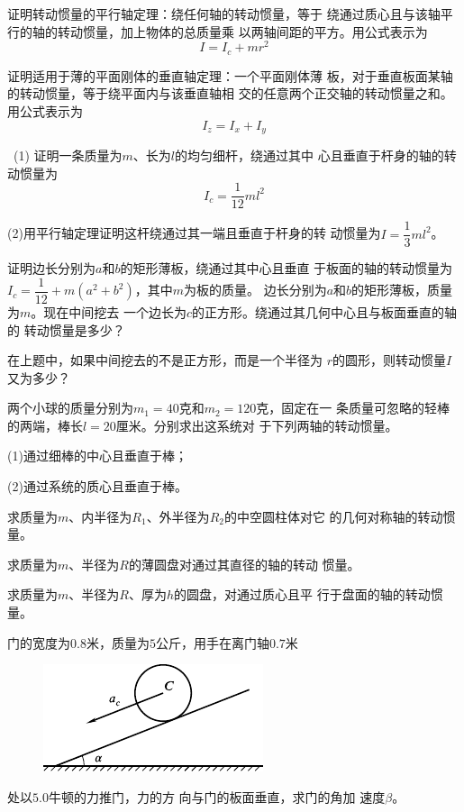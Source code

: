 \begin{exercises}

\exercise 证明转动惯量的平行轴定理：绕任何轴的转动惯量，等于
绕通过质心且与该轴平行的轴的转动惯量，加上物体的总质量乘
以两轴间距的平方。用公式表示为
\begin{equation*}
  I = I _ { c } + m r ^ { 2 }
\end{equation*}

\exercise 证明适用于薄的平面刚体的垂直轴定理：一个平面刚体薄
板，对于垂直板面某轴的转动惯量，等于绕平面内与该垂直轴相
交的任意两个正交轴的转动惯量之和。用公式表示为
\begin{equation*}
  I _ { z } = I _ { x } + I _ { y }
\end{equation*}

\exercise ~(1) 证明一条质量为$ m $、长为$ l $的均匀细杆，绕通过其中
心且垂直于杆身的轴的转动惯量为
\begin{equation*}
  I _ { c } = \frac { 1 } { 1 2 } m l ^ { 2 }
\end{equation*}

(2)用平行轴定理证明这杆绕通过其一端且垂直于杆身的转
动惯量为$ I = \dfrac { 1 } { 3 } m l ^ { 2 } $。

\exercise 证明边长分别为$ a $和$ b $的矩形薄板，绕通过其中心且垂直
于板面的轴的转动惯量为$ I _ { c } = \dfrac { 1 } { 1 2 } + m \left( a ^ { 2 } + b ^ { 2 } \right) $，其中$ m $为板的质量。
\clearpage
\exercise 边长分别为$ a $和$ b $的矩形薄板，质量为$ m $。现在中间挖去
一个边长为$ c $的正方形。绕通过其几何中心且与板面垂直的轴的
转动惯量是多少？

\exercise 在上题中，如果中间挖去的不是正方形，而是一个半径为
$ r $的圆形，则转动惯量$ I $又为多少？

\exercise 两个小球的质量分别为$ m _ { 1 } = 4 0 $克和$ m _ { 2 } = 1 2 0 $克，固定在一
条质量可忽略的轻棒的两端，棒长$ l = 2 0 $厘米。分别求出这系统对
于下列两轴的转动惯量。

(1)通过细棒的中心且垂直于棒；

(2)通过系统的质心且垂直于棒。

\exercise 求质量为$ m $、内半径为$ R_1 $、外半径为$ R_2 $的中空圆柱体对它
的几何对称轴的转动惯量。

\exercise 求质量为$ m $、半径为$ R $的薄圆盘对通过其直径的轴的转动
惯量。

\exercise 求质量为$ m $、半径为$ R $、厚为$ h $的圆盘，对通过质心且平
行于盘面的轴的转动惯量。

\exercise 门的宽度为$ 0.8 $米，质量为$ 5 $公斤，用手在离门轴$ 0.7 $米
\begin{figure}
  \centering
  \includegraphics{figure/fig10.25}
  \caption{}
  \label{fig:10.25}
\end{figure}
处以$ 5.0 $牛顿的力推门，力的方
向与门的板面垂直，求门的角加
速度$ \beta $。


\end{exercises}
